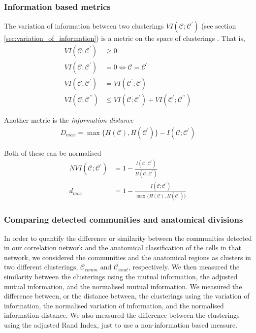       \subsubsection{Information based metrics}\label{sec:information_metrics}
      The variation of information between two clusterings $VI(\mathcal{C};\mathcal{C}^{\prime})$ (see section \ref{sec:variation_of_information}) is a metric on the space of clusterings  \parencite{meila}. That is,
      \begin{align}
          VI(\mathcal{C};\mathcal{C}^{\prime}) &\geq 0 \\
          VI(\mathcal{C};\mathcal{C}^{\prime}) &= 0 \iff \mathcal{C} = \mathcal{C}^{\prime} \\
          VI(\mathcal{C};\mathcal{C}^{\prime}) &= VI(\mathcal{C}^{\prime};\mathcal{C}) \\
          VI(\mathcal{C};\mathcal{C}^{\prime \prime}) &\leq VI(\mathcal{C};\mathcal{C}^{\prime}) + VI(\mathcal{C}^{\prime};\mathcal{C}^{\prime \prime})
      \end{align}

      Another metric is the \textit{information distance}  \parencite{vinh}
      \begin{align}
          D_{max} = \max \lbrace H(\mathcal{C}), H(\mathcal{C}^{\prime}) \rbrace - I(\mathcal{C};\mathcal{C}^{\prime})
      \end{align}

      Both of these can be normalised
      \begin{align}
          NVI(\mathcal{C};\mathcal{C}^{\prime}) & = 1 - \frac{I(\mathcal{C};\mathcal{C}^{\prime})}{H(\mathcal{C}, \mathcal{C}^{\prime})} \\
          d_{max} & = 1 - \frac{I(\mathcal{C};\mathcal{C}^{\prime})}{\max \lbrace H(\mathcal{C}), H(\mathcal{C}^{\prime}) \rbrace}
      \end{align}

      \subsubsection{Comparing detected communities and anatomical divisions}
      In order to quantify the difference or similarity between the communities detected in our correlation network and the anatomical classification of the cells in that network, we considered the communities and the anatomical regions as clusters in two different clusterings, $\mathcal{C}_{comm}$ and $\mathcal{C}_{anat}$, respectively. We then measured the similarity between the clusterings using the mutual information, the adjusted mutual information, and the normalised mutual information. We measured the difference between, or the distance between, the clusterings using the variation of information, the normalised variation of information, and the normalised information distance. We also measured the difference between the clusterings using the adjusted Rand Index, just to use a non-information based measure.

